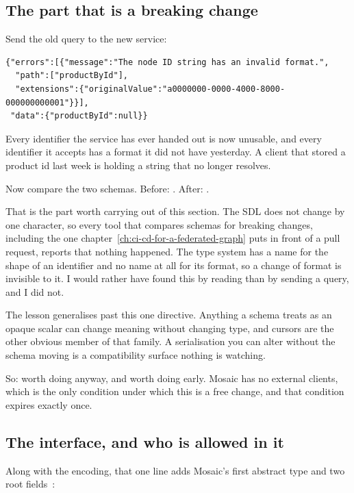 \subsection*{The part that is a breaking change}

%
Send the old query to the new service:

\begin{verbatim}
{"errors":[{"message":"The node ID string has an invalid format.",
  "path":["productById"],
  "extensions":{"originalValue":"a0000000-0000-4000-8000-000000000001"}}],
 "data":{"productById":null}}
\end{verbatim}

Every identifier the service has ever handed out is now unusable, and every
identifier it accepts has a format it did not have yesterday. A client that
stored a product id last week is holding a string that no longer resolves.

Now compare the two schemas. Before: . After: .

%
That is the part worth carrying out of this section. The SDL does not change by
one character, so every tool that compares schemas for breaking changes,
including the one chapter~\ref{ch:ci-cd-for-a-federated-graph} puts in front of
a pull request, reports that nothing happened. The type system has a name for
the shape of an identifier and no name at all for its format, so a change of
format is invisible to it. I would rather have found this by reading than by
sending a query, and I did not.

The lesson generalises past this one directive. Anything a schema treats as an
opaque scalar can change meaning without changing type, and cursors are the
other obvious member of that family. A serialisation you can alter without the
schema moving is a compatibility surface nothing is watching.

So: worth doing anyway, and worth doing early. Mosaic has no external clients,
which is the only condition under which this is a free change, and that
condition expires exactly once.

\subsection*{The interface, and who is allowed in it}

%
Along with the encoding, that one line adds Mosaic's first abstract type and two
root fields~\autocite{chillicream2026relay}:

